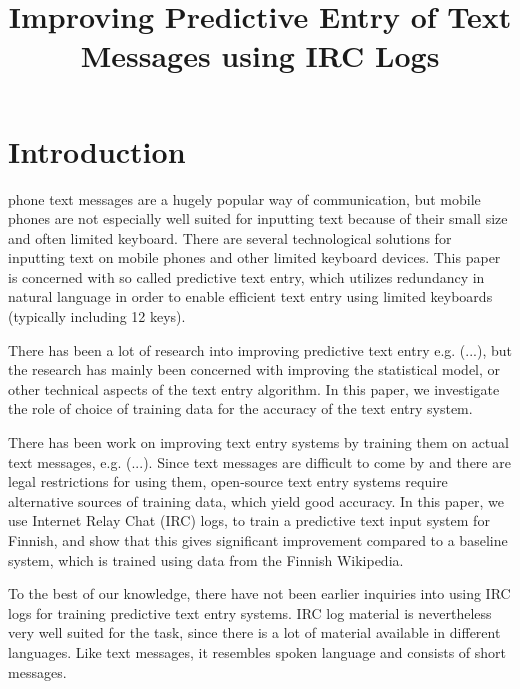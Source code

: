 \documentclass[a4paper,conference]{IEEEtran}
\title{Improving Predictive Entry of Text Messages using IRC Logs}
\author{
\IEEEauthorblockA{\ldots\\
\ldots\\
\ldots\\
\ldots}
\and
\IEEEauthorblockA{\ldots\\
\ldots\\
\ldots\\
\ldots}
\and
\IEEEauthorblockA{\ldots\\
\ldots\\
\ldots\\
\ldots}
}
\begin{document}
\maketitle


\begin{abstract}

\end{abstract}

\section{Introduction}
\label{sec:introduction}

 phone text messages are a hugely popular way
of communication, but mobile phones are not especially well suited for
inputting text because of their small size and often limited
keyboard. There are several technological solutions for inputting text
on mobile phones and other limited keyboard devices. This paper is
concerned with so called predictive text entry, which utilizes
redundancy in natural language in order to enable efficient text entry
using limited keyboards (typically including 12 keys).

There has been a lot of research into improving predictive text entry
e.g. (...), but the research has mainly been concerned with improving
the statistical model, or other technical aspects of the text entry
algorithm. In this paper, we investigate the role of choice of training
data for the accuracy of the text entry system. 

There has been work on improving text entry systems by training them
on actual text messages, e.g. (...). Since text messages are difficult
to come by and there are legal restrictions for using them,
open-source text entry systems require alternative sources of training
data, which yield good accuracy. In this paper, we use Internet Relay
Chat (IRC) logs, to train a predictive text input system for Finnish,
and show that this gives significant improvement compared to a
baseline system, which is trained using data from the Finnish
Wikipedia. 

To the best of our knowledge, there have not been earlier inquiries
into using IRC logs for training predictive text entry systems. IRC
log material is nevertheless very well suited for the task, since
there is a lot of material available in different languages. Like text
messages, it resembles spoken language and consists of short messages.
\end{document}

